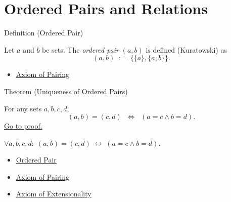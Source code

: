 
\section{Ordered Pairs and Relations}


\begin{definitionbox}{Definition (Ordered Pair)}
\begin{definition}\label{def:ordered-pair}
Let $a$ and $b$ be sets. The \emph{ordered pair} $(a,b)$ is defined (Kuratowski)
as
\[
(a,b) \;:=\; \{\{a\}, \{a,b\}\}.
\]
\end{definition}
\end{definitionbox}

\begin{dependencies}
\begin{itemize}
  \item \hyperref[ax:pairing]{Axiom of Pairing}
\end{itemize}
\end{dependencies}

\begin{theorembox}{Theorem (Uniqueness of Ordered Pairs)}
\begin{theorem}\label{thm:ordered-pair-unique}
For any sets $a,b,c,d$,
\[
(a,b) = (c,d)
\;\;\Longleftrightarrow\;\;
(a = c \land b = d).
\]
\hyperref[prf:ordered-pair-unique]{Go to proof.}
\end{theorem}
\end{theorembox}

\begin{remark*}
$\forall a, b, c, d:\; (a,b) = (c,d) \;\leftrightarrow\; (a = c \wedge b = d)$.
\end{remark*}
\begin{dependencies}
\begin{itemize}
  \item \hyperref[def:ordered-pair]{Ordered Pair}
  \item \hyperref[ax:pairing]{Axiom of Pairing}
  \item \hyperref[ax:extensionality]{Axiom of Extensionality}
\end{itemize}
\end{dependencies}

